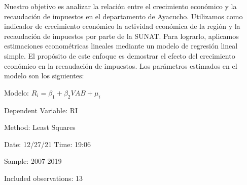 \documentclass[
  letterpaper,
  DIV=11,
  numbers=noendperiod]{scrartcl}
\begin{document}
Nuestro objetivo es analizar la relación entre el crecimiento económico
y la recaudación de impuestos en el departamento de Ayacucho. Utilizamos
como indicador de crecimiento económico la actividad económica de la
región y la recaudación de impuestos por parte de la SUNAT. Para
lograrlo, aplicamos estimaciones econométricas lineales mediante un
modelo de regresión lineal simple. El propósito de este enfoque es
demostrar el efecto del crecimiento económico en la recaudación de
impuestos. Los parámetros estimados en el modelo son los siguientes:

Modelo: \(R_i = \beta_{1} + \beta_{2}VAB + \mu_{i}\)

Dependent Variable: RI

Method: Least Squares

Date: 12/27/21 Time: 19:06

Sample: 2007-2019

Included observations: 13
\end{document}
